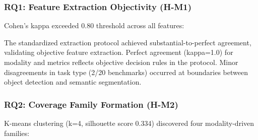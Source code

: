 
\subsubsection{RQ1: Feature Extraction Objectivity (H-M1)}

Cohen's kappa exceeded 0.80 threshold across all features:

\begin{table}[htbp]
\centering
{}
\end{table}

The standardized extraction protocol achieved substantial-to-perfect agreement, validating objective feature extraction. Perfect agreement (kappa=1.0) for modality and metrics reflects objective decision rules in the protocol. Minor disagreements in task type (2/20 benchmarks) occurred at boundaries between object detection and semantic segmentation.

\subsubsection{RQ2: Coverage Family Formation (H-M2)}

K-means clustering (k=4, silhouette score 0.334) discovered four modality-driven families:

\begin{table}[htbp]
\centering
{}
\end{table}

